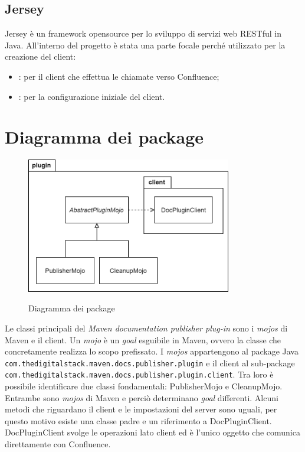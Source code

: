 \subsection{Jersey} %
Jersey è un framework opensource per lo sviluppo di servizi web RESTful in Java.
All'interno del progetto è stata una parte focale perché utilizzato per la creazione del client:
\begin{itemize}
    \item {}: per il client che effettua le chiamate verso Confluence;
    \item {}: per la configurazione iniziale del client.
\end{itemize}



\section{Diagramma dei package} %
\label{sec:diagramma-package}
\begin{figure}[H]
    \centering
    \includegraphics[width=0.8\textwidth]{immagini/PackageDiagram.png}\\
    \caption{Diagramma dei package}
\end{figure}
Le classi principali del \emph{Maven documentation publisher plug-in} sono i \emph{mojos} di Maven e il client.
Un \emph{mojo} è un \emph{goal} esguibile in Maven, ovvero la classe che concretamente realizza lo scopo prefissato.
I \emph{mojos} appartengono al package Java \texttt{com.thedigitalstack.maven.docs.publisher.plugin} e il client al sub-package\\ \texttt{com.thedigitalstack.maven.docs.publisher.plugin.client}.
Tra loro è possibile identificare due classi fondamentali: PublisherMojo e CleanupMojo.
Entrambe sono \emph{mojos} di Maven e perciò determinano \emph{goal} differenti.
Alcuni metodi che riguardano il client e le impostazioni del server sono uguali, per questo motivo esiste una classe padre e un riferimento a DocPluginClient.
DocPluginClient svolge le operazioni lato client ed è l'unico oggetto che comunica direttamente con Confluence.



